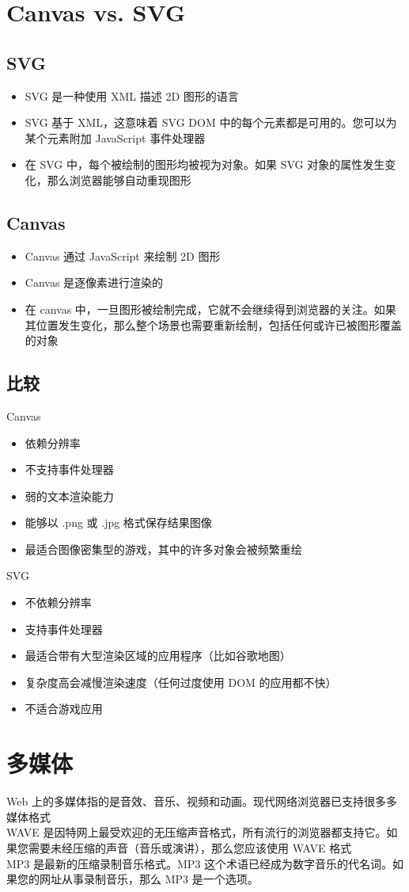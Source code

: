 \documentclass[10pt,UTF8]{ctexart}
\begin{document}
\section{Canvas vs. SVG}
\subsection{SVG}
\begin{itemize}
\item SVG 是一种使用 XML 描述 2D 图形的语言
\item SVG 基于 XML，这意味着 SVG DOM 中的每个元素都是可用的。您可以为某个元素附加 JavaScript 事件处理器
\item 在 SVG 中，每个被绘制的图形均被视为对象。如果 SVG 对象的属性发生变化，那么浏览器能够自动重现图形
\end{itemize}
\subsection{Canvas}
\begin{itemize}
\item Canvas 通过 JavaScript 来绘制 2D 图形
\item Canvas 是逐像素进行渲染的
\item 在 canvas 中，一旦图形被绘制完成，它就不会继续得到浏览器的关注。如果其位置发生变化，那么整个场景也需要重新绘制，包括任何或许已被图形覆盖的对象
\end{itemize}
\subsection{比较}
\noindent Canvas
\begin{itemize}
\item 依赖分辨率
\item 不支持事件处理器
\item 弱的文本渲染能力
\item 能够以 .png 或 .jpg 格式保存结果图像
\item 最适合图像密集型的游戏，其中的许多对象会被频繁重绘
\end{itemize}
\noindent SVG
\begin{itemize}
\item 不依赖分辨率
\item 支持事件处理器
\item 最适合带有大型渲染区域的应用程序（比如谷歌地图）
\item 复杂度高会减慢渲染速度（任何过度使用 DOM 的应用都不快）
\item 不适合游戏应用
\end{itemize}
\section{多媒体}
Web 上的多媒体指的是音效、音乐、视频和动画。现代网络浏览器已支持很多多媒体格式\\
WAVE 是因特网上最受欢迎的无压缩声音格式，所有流行的浏览器都支持它。如果您需要未经压缩的声音（音乐或演讲），那么您应该使用 WAVE 格式 \\
MP3 是最新的压缩录制音乐格式。MP3 这个术语已经成为数字音乐的代名词。如果您的网址从事录制音乐，那么 MP3 是一个选项。
\end{document}
